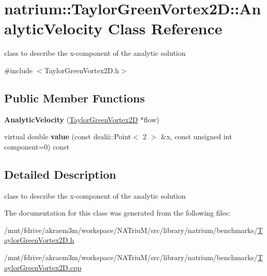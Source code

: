 \hypertarget{classnatrium_1_1TaylorGreenVortex2D_1_1AnalyticVelocity}{
\section{natrium::TaylorGreenVortex2D::AnalyticVelocity Class Reference}
\label{classnatrium_1_1TaylorGreenVortex2D_1_1AnalyticVelocity}
}


class to describe the x-\/component of the analytic solution  


{\ttfamily \#include $<$TaylorGreenVortex2D.h$>$}\subsection*{Public Member Functions}
\begin{DoxyCompactItemize}
\item 
\hypertarget{classnatrium_1_1TaylorGreenVortex2D_1_1AnalyticVelocity_a792726979799a861520617348b4d2c0a}{
{\bfseries AnalyticVelocity} (\hyperlink{classnatrium_1_1TaylorGreenVortex2D}{TaylorGreenVortex2D} $\ast$flow)}
\label{classnatrium_1_1TaylorGreenVortex2D_1_1AnalyticVelocity_a792726979799a861520617348b4d2c0a}

\item 
\hypertarget{classnatrium_1_1TaylorGreenVortex2D_1_1AnalyticVelocity_a9ba30b47d38876999ae49f092b651f86}{
virtual double {\bfseries value} (const dealii::Point$<$ 2 $>$ \&x, const unsigned int component=0) const }
\label{classnatrium_1_1TaylorGreenVortex2D_1_1AnalyticVelocity_a9ba30b47d38876999ae49f092b651f86}

\end{DoxyCompactItemize}


\subsection{Detailed Description}
class to describe the x-\/component of the analytic solution 

The documentation for this class was generated from the following files:\begin{DoxyCompactItemize}
\item 
/mnt/fdrive/akraem3m/workspace/NATriuM/src/library/natrium/benchmarks/\hyperlink{TaylorGreenVortex2D_8h}{TaylorGreenVortex2D.h}\item 
/mnt/fdrive/akraem3m/workspace/NATriuM/src/library/natrium/benchmarks/\hyperlink{TaylorGreenVortex2D_8cpp}{TaylorGreenVortex2D.cpp}\end{DoxyCompactItemize}

